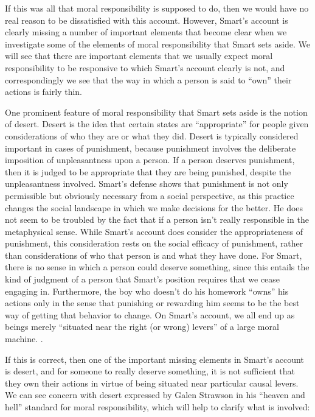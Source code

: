 \documentclass[phd,12pt,oneside,paper=letterpaper]{ubcthesis}
\begin{document}
If this was all that moral responsibility is supposed to do, then we would have no real reason to be dissatisfied with this account. However, Smart's account is clearly missing a number of important elements that become clear when we investigate some of the elements of moral responsibility that Smart sets aside. We will see that there are important elements that we usually expect moral responsibility to be responsive to which Smart's account clearly is not,  and correspondingly we see that the way in which a person is said to ``own'' their actions is fairly thin. 

One prominent feature of moral responsibility that Smart sets aside is the notion of desert. Desert is the idea that certain states are ``appropriate'' for people given considerations of who they are or what they did. Desert is typically considered important in cases of punishment, because punishment involves the deliberate imposition of unpleasantness upon a person. If a person deserves punishment, then it is judged to be appropriate that they are being punished, despite the unpleasantness involved. Smart's defense shows that punishment is not only permissible but obviously necessary from a social perspective, as this practice changes the social landscape in which we make decisions for the better. He does not seem to be troubled by the fact that if a person isn't really responsible in the metaphysical sense. While Smart's account does consider the appropriateness of punishment, this consideration rests on the social efficacy of punishment, rather than considerations of who that person is and what they have done. For Smart, there is no sense in which a person could deserve something, since this entails the kind of judgment of a person that Smart's position requires that we cease engaging in. Furthermore, the boy who doesn't do his homework ``owns'' his actions only in the sense that punishing or rewarding him seems to be the best way of getting that behavior to change. On Smart's account, we all end up as beings merely ``situated near the right (or wrong) levers'' of a large moral machine. \citep{Williams1973}. 

If this is correct, then one of the important missing elements in Smart's account is desert, and for someone to really deserve something, it is not sufficient that they own their actions in virtue of being situated near particular causal levers. We can see concern with desert expressed by Galen Strawson in his ``heaven and hell'' standard for moral responsibility, which will help to clarify what is involved:
\end{document}
